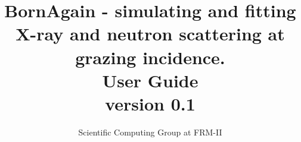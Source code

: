 \documentclass[a4paper,10pt]{report}
\title{
BornAgain - simulating and fitting X-ray and neutron scattering at grazing incidence. \\
\vspace*{10mm} User Guide \\
\large{ version 0.1}
}
\author{Scientific Computing Group at FRM-II}
\begin{document}
\maketitle
\tableofcontents
\lstlistoflistings
\listoftables

%
%
%
%

%


%



\end{document}
